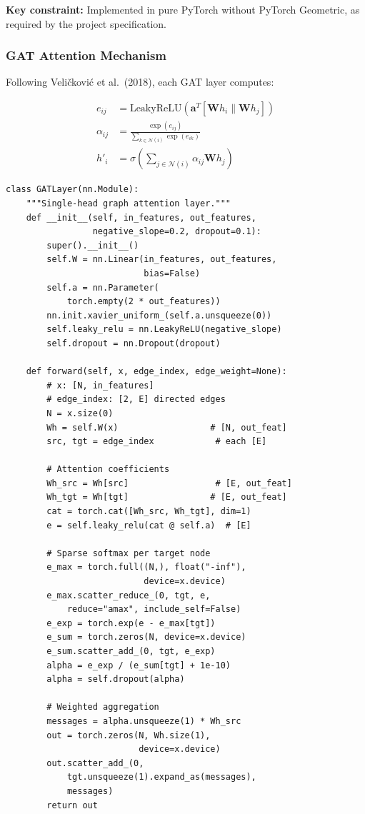 \textbf{Key constraint:} Implemented in pure PyTorch without PyTorch Geometric, as required by the project specification.

\subsubsection{GAT Attention Mechanism}

Following Veli\v{c}kovi\'c et al.\ (2018), each GAT layer computes:

\begin{align}
    e_{ij} &= \text{LeakyReLU}\left(\mathbf{a}^T [\mathbf{W}h_i \| \mathbf{W}h_j]\right) \\
    \alpha_{ij} &= \frac{\exp(e_{ij})}{\sum_{k \in \mathcal{N}(i)} \exp(e_{ik})} \\
    h'_i &= \sigma\left(\sum_{j \in \mathcal{N}(i)} \alpha_{ij} \mathbf{W} h_j\right)
\end{align}

\begin{lstlisting}[caption={Custom GAT layer (src/models/gat\_model.py)}]
class GATLayer(nn.Module):
    """Single-head graph attention layer."""
    def __init__(self, in_features, out_features,
                 negative_slope=0.2, dropout=0.1):
        super().__init__()
        self.W = nn.Linear(in_features, out_features,
                           bias=False)
        self.a = nn.Parameter(
            torch.empty(2 * out_features))
        nn.init.xavier_uniform_(self.a.unsqueeze(0))
        self.leaky_relu = nn.LeakyReLU(negative_slope)
        self.dropout = nn.Dropout(dropout)

    def forward(self, x, edge_index, edge_weight=None):
        # x: [N, in_features]
        # edge_index: [2, E] directed edges
        N = x.size(0)
        Wh = self.W(x)                  # [N, out_feat]
        src, tgt = edge_index            # each [E]

        # Attention coefficients
        Wh_src = Wh[src]                 # [E, out_feat]
        Wh_tgt = Wh[tgt]                # [E, out_feat]
        cat = torch.cat([Wh_src, Wh_tgt], dim=1)
        e = self.leaky_relu(cat @ self.a)  # [E]

        # Sparse softmax per target node
        e_max = torch.full((N,), float("-inf"),
                           device=x.device)
        e_max.scatter_reduce_(0, tgt, e,
            reduce="amax", include_self=False)
        e_exp = torch.exp(e - e_max[tgt])
        e_sum = torch.zeros(N, device=x.device)
        e_sum.scatter_add_(0, tgt, e_exp)
        alpha = e_exp / (e_sum[tgt] + 1e-10)
        alpha = self.dropout(alpha)

        # Weighted aggregation
        messages = alpha.unsqueeze(1) * Wh_src
        out = torch.zeros(N, Wh.size(1),
                          device=x.device)
        out.scatter_add_(0,
            tgt.unsqueeze(1).expand_as(messages),
            messages)
        return out
\end{lstlisting}

